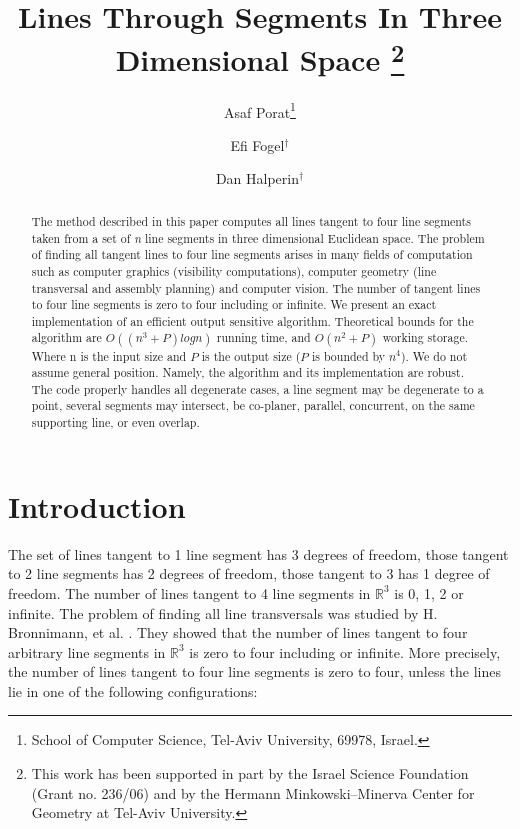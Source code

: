 \documentclass[11pt]{article}
\title{Lines Through Segments In Three Dimensional Space
  \thanks{This work has been supported in part by the Israel Science
    Foundation (Grant no. 236/06) and by the Hermann Minkowski--Minerva
    Center for Geometry at Tel-Aviv University.}}
\author{Asaf Porat\thanks{School of Computer Science, Tel-Aviv
  University, 69978, Israel. \email{\{efif,danha\}@post.tau.ac.il}}
  \and Efi Fogel$^{\dagger}$
  \and Dan Halperin$^{\dagger}$
}
\begin{document}
\maketitle
\begin{abstract}
The method described in this paper computes all lines tangent to four line 
segments taken from a set of \textit{n} line segments in three dimensional 
Euclidean space.
The problem of finding all tangent lines to four line segments arises in many
fields of computation such as computer graphics (visibility computations), 
computer geometry (line transversal and assembly planning) and computer 
vision.\newline
The number of tangent lines to four line segments is zero to four including or
infinite. We present an exact implementation of an efficient output sensitive
algorithm.\newline
Theoretical bounds for the algorithm are $O((n^3 + P)log n)$ running time, and
$O(n^2 + P)$ working storage. Where n is the input size and $P$ is the output
size ($P$ is bounded by $n^4$).\newline
We do not assume general position. Namely, the algorithm and its implementation
are robust. The code properly handles all degenerate cases, a line segment may
be degenerate to a point, several segments may intersect, be co-planer, 
parallel, concurrent, on the same supporting line, or even overlap.

\end{abstract}
\section{Introduction}
The set of lines tangent to 1 line segment has 3 degrees of freedom, those
tangent to 2 line segments has 2 degrees of freedom, those tangent to 3 has 1 
degree of freedom.\newline
The number of lines tangent to 4 line segments in $\mathbb{R}^3$ is 0, 1, 2 or 
infinite. The problem of finding all line transversals was studied by H. 
Bronnimann, et al. \cite{springerlink:10.1007/s00454-005-1183-1}.
They showed that the number of lines tangent to four arbitrary line segments 
in $\mathbb{R}^3$ is zero to four including or infinite. More precisely, the 
number of lines tangent to four line segments is zero to four, unless the 
lines lie in one of the following configurations:
\end{document}
